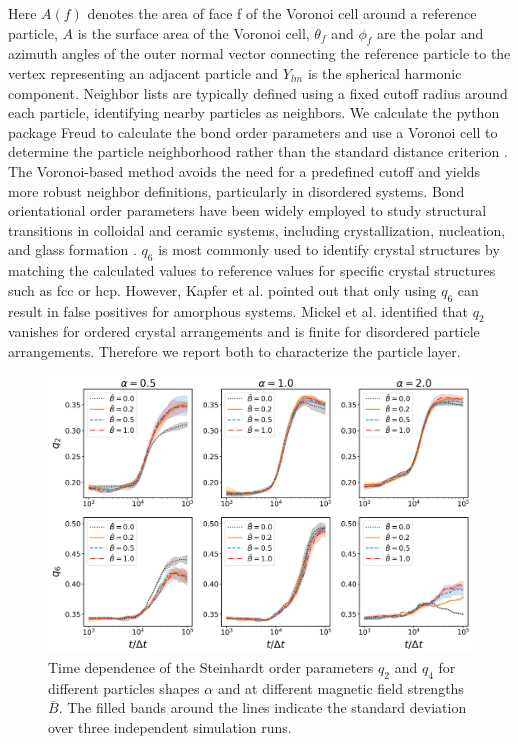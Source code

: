 Here $A(f)$ denotes the area of face f of the Voronoi cell around a reference particle, $A$ is the surface area of the Voronoi cell, 
$\theta_f$ and $\phi_f$ are the polar and azimuth angles of the outer normal vector connecting the reference particle to the vertex representing
an adjacent particle and $Y_{lm}$ is the spherical harmonic component. 
Neighbor lists are typically defined using a fixed cutoff radius around each particle, identifying nearby particles as neighbors. 
We calculate the python package Freud to calculate the bond order parameters and use a Voronoi cell to determine the particle neighborhood rather than the standard distance criterion 
\cite{ramasubramani_freud_2020,mickel_shortcomings_2013}. The Voronoi-based method avoids the need for a predefined cutoff and yields more robust neighbor definitions, particularly in disordered systems. 
Bond orientational order parameters have been widely employed to study structural transitions in colloidal and ceramic systems, including crystallization, nucleation, and glass formation 
\cite{vagberg_glassiness_2011, besseling_three-dimensional_2007, schall_structural_2007, ozawa_jamming_2012}. $q_6$ is most commonly used to identify crystal structures by matching the calculated
values to reference values for specific crystal structures such as fcc or hcp. However, Kapfer et al. pointed out that only using $q_6$ can result in false positives for amorphous systems. \cite{kapfer_jammed_2012}
Mickel et al. identified that $q_2$ vanishes for ordered crystal arrangements and is finite for disordered particle arrangements. \cite{mickel_shortcomings_2013} Therefore we report both to
characterize the particle layer. 

\begin{figure}
\centering
\includegraphics[scale = 0.38]{../figures/results/paper1_5/steinhardt_time.png}%
\caption{Time dependence of the Steinhardt order parameters $q_2$ and $q_4$ for different particles shapes $\alpha$ and at different magnetic field strengths $\bar{B}$. The filled bands around the lines indicate the standard deviation over three independent simulation runs.}
\label{fig:steinhardt_time}%
\end{figure}

